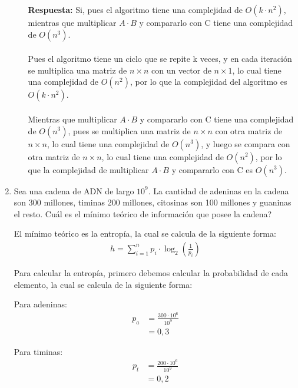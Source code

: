 \documentclass{templateNote}
\begin{document}
\begin{enumerate}
\begin{itemize}
        \textbf{Respuesta:} Si, pues el algoritmo tiene una complejidad de $O(k \cdot n^2)$, mientras que multiplicar $A \cdot B$ y compararlo con C tiene una complejidad de $O(n^3)$.
        \\
        \\
        Pues el algoritmo tiene un ciclo que se repite k veces, y en cada iteración se multiplica una matriz de $n \times n$ con un vector de $n \times 1$, lo cual tiene una complejidad de $O(n^2)$, por lo que la complejidad del algoritmo es $O(k \cdot n^2)$.
        \\
        \\
        Mientras que multiplicar $A \cdot B$ y compararlo con C tiene una complejidad de $O(n^3)$, pues se multiplica una matriz de $n \times n$ con otra matriz de $n \times n$, lo cual tiene una complejidad de $O(n^3)$, y luego se compara con otra matriz de $n \times n$, lo cual tiene una complejidad de $O(n^2)$, por lo que la complejidad de multiplicar $A \cdot B$ y compararlo con C es $O(n^3)$.
    \end{itemize}

    \item Sea una cadena de ADN de largo $10^9$. La cantidad de adeninas en la cadena son 300 millones, timinas 200 millones, citosinas son 100 millones y guaninas el resto. Cuál es el mínimo teórico de información que posee la cadena?
    
    El mínimo teórico es la entropía, la cual se calcula de la siguiente forma:
    \begin{align*}
        h = \sum_{i=1}^{n} p_i \cdot \log_2 \left( \frac{1}{p_i} \right)
    \end{align*}

    Para calcular la entropía, primero debemos calcular la probabilidad de cada elemento, la cual se calcula de la siguiente forma:

    \begin{minipage}{0.45\textwidth}
        Para adeninas:
        \begin{align*}
            p_{a} &= \frac{300 \cdot 10^6}{10^9} \\
            &= 0,3
        \end{align*}
    \end{minipage}
    \hfill
    \begin{minipage}{0.45\textwidth}
        Para timinas:
        \begin{align*}
            p_{t} &= \frac{200 \cdot 10^6}{10^9} \\
            &= 0,2
        \end{align*}
    \end{minipage}


\end{enumerate}
\end{document}
